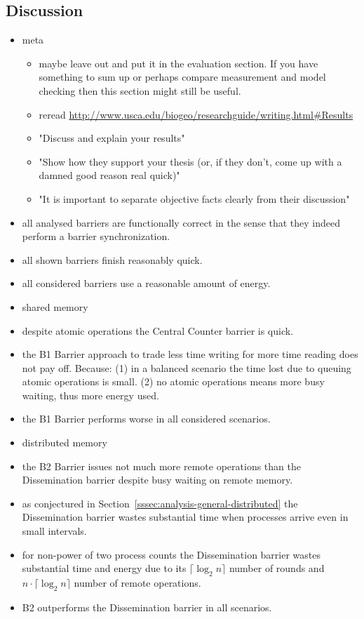 \documentclass[a4paper, 10pt]{article}
\begin{document}
\subsection{Discussion}
\label{ssec:analysis-discussion}
\begin{itemize}
	\item meta
		\begin{itemize}
			\item maybe leave out and put it in the evaluation section. If you have something to sum up or perhaps compare measurement and model checking then this section might still be useful.
			\item reread \url{http://www.usca.edu/biogeo/researchguide/writing.html#Results}
			\item "Discuss and explain your results"
			\item "Show how they support your thesis (or, if they don't, come up with a damned good reason real quick)"
			\item "It is important to separate objective facts clearly from their discussion"
		\end{itemize}

	\item all analysed barriers are functionally correct in the sense that they indeed perform a barrier synchronization.
	\item all shown barriers finish reasonably quick.
	\item all considered barriers use a reasonable amount of energy.

	\item shared memory
	\item despite atomic operations the Central Counter barrier is quick.
	\item the B1 Barrier approach to trade less time writing for more time reading does not pay off. Because: (1) in a balanced scenario the time lost due to queuing atomic operations is small. (2) no atomic operations means more busy waiting, thus more energy used.
	\item the B1 Barrier performs worse in all considered scenarios.

	\item distributed memory
	\item the B2 Barrier issues not much more remote operations than the Dissemination barrier despite busy waiting on remote memory.
	\item as conjectured in Section~\ref{sssec:analysis-general-distributed} the Dissemination barrier wastes substantial time when processes arrive even in small intervals.
	\item for non-power of two process counts the Dissemination barrier wastes substantial time and energy due to its $\lceil \log_2 n \rceil$ number of rounds and $n \cdot \lceil \log_2 n \rceil$ number of remote operations.
	\item B2 outperforms the Dissemination barrier in all scenarios.


\end{itemize}
\end{document}
